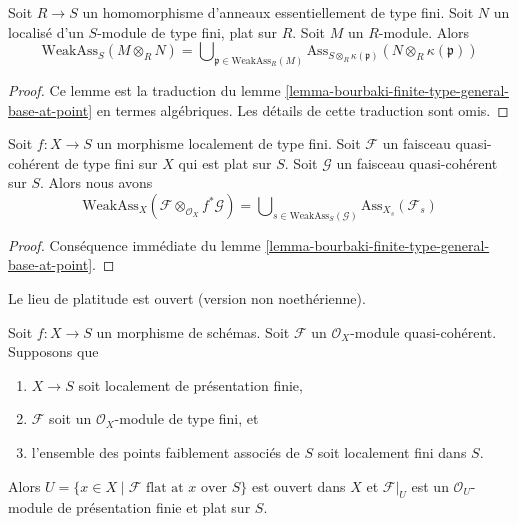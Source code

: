\begin{lemma}
\label{lemma-weak-bourbaki}
Soit $R \to S$ un homomorphisme d'anneaux essentiellement de type fini.
Soit $N$ un localisé d'un $S$-module de type fini, plat sur $R$.
Soit $M$ un $R$-module. Alors
$$
\text{WeakAss}_S(M \otimes_R N)
=
\bigcup\nolimits_{\mathfrak p \in \text{WeakAss}_R(M)}
\text{Ass}_{S \otimes_R \kappa(\mathfrak p)}(N \otimes_R \kappa(\mathfrak p))
$$
\end{lemma}

\begin{proof}
Ce lemme est la traduction
du lemme \ref{lemma-bourbaki-finite-type-general-base-at-point}
en termes algébriques. Les détails de cette traduction sont omis.
\end{proof}

\begin{lemma}
\label{lemma-bourbaki-finite-type-general-base}
Soit $f : X \to S$ un morphisme localement de type fini.
Soit $\mathcal{F}$ un faisceau quasi-cohérent de type fini sur $X$
qui est plat sur $S$. Soit $\mathcal{G}$ un faisceau quasi-cohérent sur $S$.
Alors nous avons
$$
\text{WeakAss}_X(\mathcal{F} \otimes_{\mathcal{O}_X} f^*\mathcal{G}) =
\bigcup\nolimits_{s \in \text{WeakAss}_S(\mathcal{G})}
\text{Ass}_{X_s}(\mathcal{F}_s)
$$
\end{lemma}

\begin{proof}
Conséquence immédiate du
lemme \ref{lemma-bourbaki-finite-type-general-base-at-point}.
\end{proof}

\begin{theorem}
\label{theorem-finite-type-flat}
\begin{slogan}
Le lieu de platitude est ouvert (version non noethérienne).
\end{slogan}
Soit $f : X \to S$ un morphisme de schémas.
Soit $\mathcal{F}$ un $\mathcal{O}_X$-module quasi-cohérent.
Supposons que
\begin{enumerate}
\item $X \to S$ soit localement de présentation finie,
\item $\mathcal{F}$ soit un $\mathcal{O}_X$-module de type fini, et
\item l'ensemble des points faiblement associés de $S$ soit localement fini dans $S$.
\end{enumerate}
Alors $U = \{x \in X \mid \mathcal{F}\text{ flat at }x\text{ over }S\}$
est ouvert dans $X$ et $\mathcal{F}|_U$ est un $\mathcal{O}_U$-module
de présentation finie et plat sur $S$.
\end{theorem}

